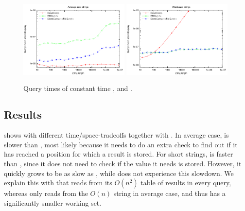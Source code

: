 \documentclass[a4]{article}
\newcommand*{\pref}{\prettyref}
\begin{document}
\begin{figure}[tp]
    \begin{center}
        \includegraphics[width=0.49\textwidth,type=pdf,ext=.pdf,read=.pdf]{../src/results/length-rmq-directcomp-rand10.plt}
        \includegraphics[width=0.49\textwidth,type=pdf,ext=.pdf,read=.pdf]{../src/results/length-rmq-directcomp-alla.plt}
    \end{center}
    \caption{\label{fig:plot-rmq-directcomp}Query times of constant time ,  and .}
\end{figure}

\subsection{ Results}


\pref{fig:plot-complookup} shows  with different time/space-tradeoffs together with . In average case,  is slower than , most likely because it needs to do an extra check to find out if it has reached a position for which a result is stored. For short strings,  is faster than , since it does not need to check if the value it needs is stored. However, it quickly grows to be as slow as , while  does not experience this slowdown. We explain this with that  reads from its $O(n^2)$ table of results in every query, whereas  only reads from the $O(n)$ string in average case, and thus has a significantly smaller working set.
\end{document}

